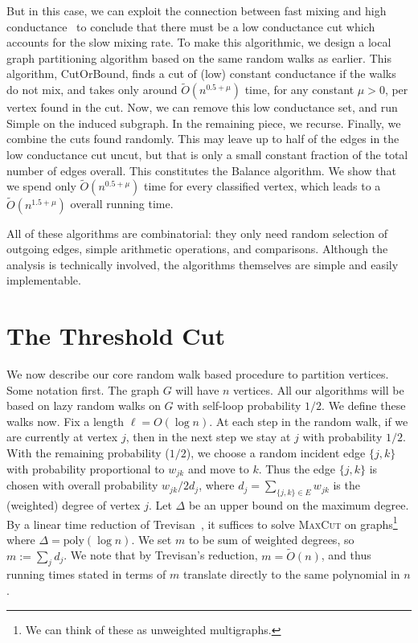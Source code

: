 \documentclass[11pt]{article}
\newcommand \poly{\mbox{poly}}
\newcommand\Balance{{\sc Balance}\xspace}
\newcommand\Simple{{\sc Simple}\xspace}
\newcommand\CutOrBound{{\sc CutOrBound}\xspace}
\newcommand\otilde{\widetilde{O}}
\def\maxcut{\textsc{MaxCut}\xspace}
\begin{document}
But in this case, we can exploit the connection between fast mixing and high conductance~\cite{sinclair, M89, LS90} to conclude that there must be a low conductance cut which accounts for the slow mixing rate. To make this algorithmic, we design a local graph partitioning algorithm based on the same random walks as earlier. This algorithm, \CutOrBound, finds a cut of (low) constant conductance if the walks do not mix, and takes only around $\otilde(n^{0.5 + \mu})$ time, for any constant $\mu > 0$, per vertex found in the cut. Now, we can remove this low conductance set, and run \Simple on
the induced subgraph. In the remaining piece, we recurse. Finally, we combine the cuts found randomly.
This may leave up to half of the edges in the low conductance cut uncut, but that is only a small constant fraction of the total number of edges overall. This constitutes the \Balance algorithm. We show that we spend only $\otilde(n^{0.5 + \mu})$ time for every classified vertex, which leads to a $\otilde(n^{1.5 + \mu})$ overall running time.

All of these algorithms are combinatorial: they only need random selection of outgoing edges, simple arithmetic operations, and comparisons. Although the analysis is technically involved, the algorithms themselves are simple and easily implementable.


\section{The Threshold Cut} \label{sec:cut}

We now describe our core random walk based procedure to partition vertices.
Some notation first.
The graph $G$ will have $n$ vertices. All our algorithms will be based on lazy
random walks on $G$ with self-loop probability $1/2$. We define these walks now. Fix a
length $\ell = O(\log n)$. At each step in the random walk, if we are currently
at vertex $j$, then in the next step we stay at $j$ with probability $1/2$.
With the remaining probability ($1/2$), we choose a random incident edge $\{j,
k\}$ with probability proportional to $w_{jk}$ and move to $k$. Thus the edge
$\{j, k\}$ is chosen with overall probability $w_{jk}/2d_j$, where $d_j =
\sum_{\{j, k\} \in E} w_{jk}$ is the (weighted) degree of vertex $j$. Let
$\Delta$ be an upper bound on the maximum degree. By a linear time reduction of
Trevisan~\cite{Tre01,Tre09}, it suffices to solve \maxcut on graphs\footnote{We
can think of these as unweighted multigraphs.} where $\Delta = \poly(\log n)$.
We set $m$ to be sum of weighted degrees, so $m := \sum_j d_j$. We note that by
Trevisan's reduction, $m = \otilde(n)$, and thus running times stated in terms
of $m$ translate directly to the same polynomial in $n$.
\end{document}
